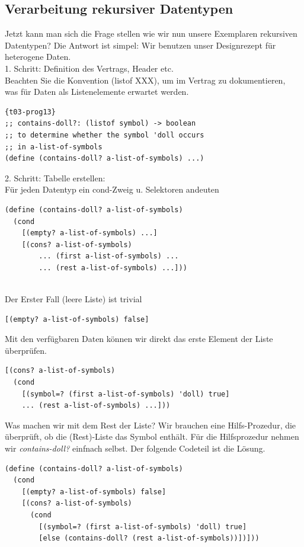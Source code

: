 \subsection{Verarbeitung rekursiver Datentypen}
Jetzt kann man sich die Frage stellen wie wir nun unsere Exemplaren rekursiven Datentypen? Die Antwort ist simpel: Wir benutzen unser Designrezept für heterogene Daten.\\

1. Schritt: Definition des Vertrags, Header etc. \\
Beachten Sie die Konvention (listof XXX), um im Vertrag zu dokumentieren, \\
was für Daten als Listenelemente erwartet werden.
\begin{lstlisting}{t03-prog13}
;; contains-doll?: (listof symbol) -> boolean
;; to determine whether the symbol 'doll occurs
;; in a-list-of-symbols
(define (contains-doll? a-list-of-symbols) ...)
\end{lstlisting}

2. Schritt: Tabelle erstellen:\\
Für jeden Datentyp ein cond-Zweig u. Selektoren andeuten\\
\begin{lstlisting}[firstnumber=4]
(define (contains-doll? a-list-of-symbols)
  (cond
    [(empty? a-list-of-symbols) ...]
    [(cons? a-list-of-symbols)
        ... (first a-list-of-symbols) ...
        ... (rest a-list-of-symbols) ...]))
\end{lstlisting}\\
Der Erster Fall (leere Liste) ist trivial
\begin{lstlisting}[firstnumber=6]
[(empty? a-list-of-symbols) false]
\end{lstlisting}

Mit den verfügbaren Daten können wir direkt das erste Element
der Liste überprüfen.

\begin{lstlisting}[firstnumber=7]
[(cons? a-list-of-symbols)
  (cond
    [(symbol=? (first a-list-of-symbols) 'doll) true]
    ... (rest a-list-of-symbols) ...]))
\end{lstlisting}
Was machen wir mit dem Rest der Liste? Wir brauchen eine Hilfs-Prozedur, die überprüft, ob die (Rest)-Liste das Symbol enthält. Für die Hilfsprozedur nehmen wir \textit{contains-doll?} einfnach selbst. Der folgende Codeteil ist die Lösung.

\begin{lstlisting}
(define (contains-doll? a-list-of-symbols)
  (cond
    [(empty? a-list-of-symbols) false]
    [(cons? a-list-of-symbols)
      (cond
        [(symbol=? (first a-list-of-symbols) 'doll) true]
        [else (contains-doll? (rest a-list-of-symbols))])]))
\end{lstlisting}

